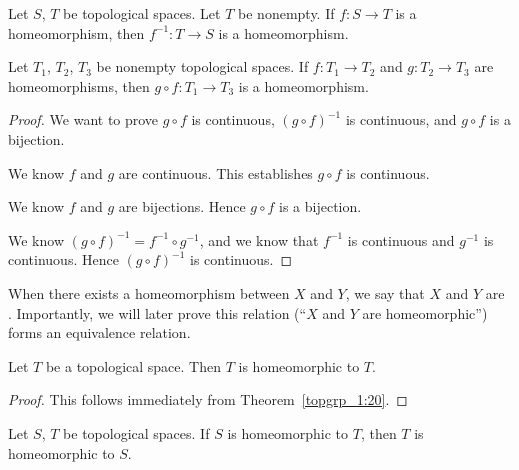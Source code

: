 \begin{theorem}\label{tops_2:56}
Let $S$, $T$ be topological spaces. Let $T$ be nonempty.
If $f\colon S\to T$ is a homeomorphism, then $f^{-1}\colon T\to S$
is a homeomorphism.
\end{theorem}

\begin{theorem}\label{tops_2:57}
Let $T_{1}$, $T_{2}$, $T_{3}$ be nonempty topological spaces.
If $f\colon T_{1}\to T_{2}$ and $g\colon T_{2}\to T_{3}$ are homeomorphisms,
then $g\circ f\colon T_{1}\to T_{3}$ is a homeomorphism.
\end{theorem}

\begin{proof}
We want to prove $g\circ f$ is continuous, $(g\circ f)^{-1}$ is continuous,
and $g\circ f$ is a bijection.

We know $f$ and $g$ are continuous. This establishes $g\circ f$ is continuous.

We know $f$ and $g$ are bijections. Hence $g\circ f$ is a bijection.

We know $(g\circ f)^{-1}=f^{-1}\circ g^{-1}$, and we know that
$f^{-1}$ is continuous and $g^{-1}$ is continuous.
Hence $(g\circ f)^{-1}$ is continuous.
\end{proof}

\begin{definition}
When there exists a homeomorphism between $X$ and $Y$, we say that $X$
and $Y$ are . Importantly, we will later prove
this relation (``$X$ and $Y$ are homeomorphic'') forms an equivalence relation.
\end{definition}

\begin{theorem}
Let $T$ be a topological space. Then $T$ is homeomorphic to $T$.
\end{theorem}

\begin{proof}
This follows immediately from Theorem~\ref{topgrp_1:20}.
\end{proof}

\begin{theorem}
Let $S$, $T$ be topological spaces. If $S$ is homeomorphic to $T$,
then $T$ is homeomorphic to $S$.
\end{theorem}


